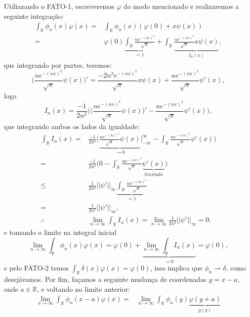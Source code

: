 \documentclass{article}
\begin{document}
\begin{enumerate}
\begin{enumerate}
				Utiliazando o FATO-1, escreveremos $\varphi$ do modo mencionado e realizaremos a seguinte integração:
				$$
				\begin{aligned}
				\int_{\mathbb{R}} \phi_{n}(x)\varphi(x) 
				= &\int_{\mathbb{R}} \phi_{n}(x)(\varphi(0) + x\psi(x)) \\
				= & \varphi(0) \underbrace{\int_{\mathbb{R}} \frac{ne^{-(nx)^{2}}}{\sqrt{\pi}} }_{=1} + \int_{\mathbb{R}} \underbrace{ \frac{ne^{-(nx)^{2}}}{\sqrt{\pi}} x\psi(x) }_{I_{n}(x)},
				\end{aligned}
				$$
				que integrando por partes, teremos:
				$$
				\Big(\frac{ne^{-(nx)^{2}}}{\sqrt{\pi}} \psi(x)\Big)' = \frac{-2n^{3}e^{-(nx)^{2}}}{\sqrt{\pi}} x\psi(x) + \frac{ne^{-(nx)^{2}}}{\sqrt{\pi}} \psi'(x), 
				$$
				logo
				$$
				I_{n}(x) = \frac{-1}{2n^{2}}	\Big( \Big( \frac{ne^{-(nx)^{2}}}{\sqrt{\pi}} \psi(x)\Big)' - \frac{ne^{-(nx)^{2}}}{\sqrt{\pi}} \psi'(x) \Big), 
				$$
				que integrando ambos os lados da igualdade:
				$$
				\begin{aligned}
				\int_{\mathbb{R}} I_{n}(x) 
				= & \frac{-1}{2n^{2}}	\Big(  \underbrace{ \frac{ne^{-(nx)^{2}}}{\sqrt{\pi}} \psi(x) }_{\to 0} \Big|^{\infty}_{-\infty} - \int_{\mathbb{R}} \frac{ne^{-(nx)^{2}}}{\sqrt{\pi}} \psi'(x) \Big) \\
				= & \frac{-1}{2n^{2}}	\Big(  0 - \int_{\mathbb{R}} \frac{ne^{-(nx)^{2}}}{\sqrt{\pi}} \underbrace{ \psi'(x) }_{limitada} \Big) \\
				\leq & \frac{1}{2n^{2}} ||\psi'||_{\infty} \underbrace{ \int_{\mathbb{R}} \frac{ne^{-(nx)^{2}}}{\sqrt{\pi}} }_{=1} \\
				= & \frac{1}{2n^{2}} ||\psi'||_{\infty}, \\
				\therefore & \lim_{n \to \infty} \int_{\mathbb{R}} I_{n}(x) = \lim_{n \to \infty}  \frac{1}{2n^{2}} ||\psi'||_{\infty} = 0.
				\end{aligned}
				$$
				e tomando o limite na integral inicial
				$$
				\lim_{n \to \infty} \int_{\mathbb{R}} \phi_{n}(x)\varphi(x) 
				= \varphi(0) + \underbrace{ \lim_{n \to \infty} \int_{\mathbb{R}} I_{n}(x) }_{=0}= \varphi(0),
				$$
				e pelo FATO-2 temos $\int_{\mathbb{R}} \delta(x)\varphi(x) = \varphi(0)$, isso implica que $\phi_{n} \rightharpoonup \delta$, como desejávamos.
				Por fim, façamos a seguinte mudança de coordenadas $y=x-a$, onde $a \in \mathbb{R}$, e voltando no limite anterior:
				$$
				\begin{aligned}
				\lim_{n \to \infty} \int_{\mathbb{R}} \phi_{n}(x -a)\varphi(x) 
				= & \lim_{n \to \infty} \int_{\mathbb{R}} \phi_{n}(y) \underbrace{ \varphi(y+a) }_{g(y)}\\ 

\end{aligned}$$
\end{enumerate}
\end{enumerate}
\end{document}
